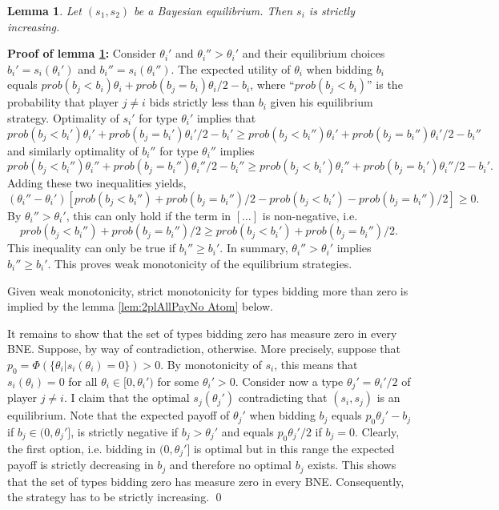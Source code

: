 \documentclass[a4paper,11pt]{article}
\newtheorem{lemma}{Lemma}
\begin{document}
\begin{lemma}\label{lem:2plAllPayMono}
  Let $(s_1,s_2)$ be a Bayesian equilibrium. Then $s_i$ is strictly increasing.
\end{lemma}
\textbf{Proof of lemma \ref{lem:2plAllPayMono}:} Consider $\theta _i'$ and $\theta _i''>\theta _i'$ and their equilibrium choices $b_i'=s_i(\theta _i')$ and $b_i''=s_i(\theta _i'')$. The expected utility of $\theta _i$ when bidding $b_i$ equals $prob(b_j<b_i)\theta _i+prob(b_j=b_i)\theta _i/2-b_i$, where ``$prob(b_j<b_i)$'' is the probability that player $j\neq i$ bids strictly less than $b_i$ given his equilibrium strategy. Optimality of $s_i'$ for type $\theta _i'$ implies that
\begin{equation*}
  prob(b_j<b_i')\theta _i'+prob(b_j=b_i')\theta _i'/2-b_i'\geq prob(b_j<b_i'')\theta _i'+prob(b_j=b_i'')\theta _i'/2-b_i''
\end{equation*}
and similarly optimality of $b_i''$ for type $\theta _i''$ implies
\begin{equation*}
  prob(b_j<b_i'')\theta _i''+prob(b_j=b_i'')\theta _i''/2-b_i''\geq prob(b_j<b_i')\theta _i''+prob(b_j=b_i')\theta _i''/2-b_i'.
\end{equation*}
Adding these two inequalities yields,
\begin{equation*}
  (\theta _i''-\theta _i') \left[prob(b_j<b_i'')+prob(b_j=b_i'')/2-prob(b_j<b_i')-prob(b_j=b_i'')/2\right]\geq 0. 
\end{equation*}
By $\theta _i''>\theta _i'$, this can only hold if the term in $[\dots]$ is non-negative, i.e. 
\begin{equation*}
  prob(b_j<b_i'')+prob(b_j=b_i'')/2\geq prob(b_j<b_i')+prob(b_j=b_i'')/2.
\end{equation*}
This inequality can only be true if $b_i''\geq b_i'$. In summary, $\theta _i''>\theta _i'$ implies $b_i''\geq b_i'$. This proves weak monotonicity of the equilibrium strategies.

Given weak monotonicity, strict monotonicity for types bidding more than zero is implied by the lemma \ref{lem:2plAllPayNo Atom} below.

It remains to show that the set of types bidding zero has measure zero in every BNE. Suppose, by way of contradiction, otherwise. More precisely, suppose that $p_0=\Phi(\{\theta _i| s_i(\theta _i)=0\})>0$. By monotonicity of $s_i$, this means that $s_i(\theta _i)=0$ for all $\theta _i\in[0,\theta _i')$ for some $\theta _i'>0$. Consider now a type $\theta _j'=\theta _i'/2$ of player $j\neq i$. I claim that the optimal $s_j(\theta _j')$ contradicting that $(s_i,s_j)$ is an equilibrium. Note that the expected payoff of $\theta _j'$ when bidding $b_j$ equals $p_0 \theta _j'-b_j$ if $b_j\in(0,\theta _j']$, is strictly negative if $b_j>\theta _j'$ and equals $p_0\theta _j'/2$ if $b_j=0$. Clearly, the first option, i.e. bidding in $(0,\theta _j']$ is optimal but in this range the expected payoff is strictly decreasing in $b_j$ and therefore no optimal $b_j$ exists. This shows that the set of types bidding zero has measure zero in every BNE. Consequently, the strategy has to be strictly increasing.
\qed
\end{document}
